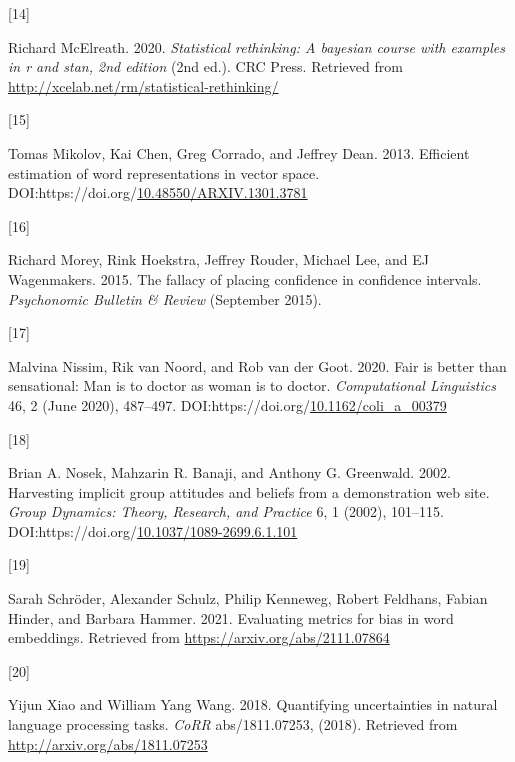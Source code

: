 \documentclass[
  12pt,
  dvipsnames,enabledeprecatedfontcommands]{scrartcl}
\newlength{\cslhangindent}
\newlength{\csllabelwidth}
\newlength{\cslentryspacingunit} %
\newenvironment{CSLReferences}[2] %
 {%
  \setlength{\parindent}{0pt}
  \ifodd #1
  \let\oldpar\par
  \def\par{\hangindent=\cslhangindent\oldpar}
  \fi
  \setlength{\parskip}{#2\cslentryspacingunit}
 }%
 {}
\newcommand{\CSLLeftMargin}[1]{\parbox[t]{\csllabelwidth}{#1}}
\newcommand{\CSLRightInline}[1]{\parbox[t]{\linewidth - \csllabelwidth}{#1}\break}
\begin{document}
\begin{CSLReferences}{0}{0}
\leavevmode{}%
\CSLLeftMargin{{[}14{]} }%
\CSLRightInline{Richard McElreath. 2020. \emph{Statistical rethinking: A
bayesian course with examples in r and stan, 2nd edition} (2nd ed.). CRC
Press. Retrieved from
\url{http://xcelab.net/rm/statistical-rethinking/}}

\leavevmode{}%
\CSLLeftMargin{{[}15{]} }%
\CSLRightInline{Tomas Mikolov, Kai Chen, Greg Corrado, and Jeffrey Dean.
2013. Efficient estimation of word representations in vector space.
DOI:https://doi.org/\href{https://doi.org/10.48550/ARXIV.1301.3781}{10.48550/ARXIV.1301.3781}}

\leavevmode{}%
\CSLLeftMargin{{[}16{]} }%
\CSLRightInline{Richard Morey, Rink Hoekstra, Jeffrey Rouder, Michael
Lee, and EJ Wagenmakers. 2015. The fallacy of placing confidence in
confidence intervals. \emph{Psychonomic Bulletin \& Review} (September
2015).}

\leavevmode{}%
\CSLLeftMargin{{[}17{]} }%
\CSLRightInline{Malvina Nissim, Rik van Noord, and Rob van der Goot.
2020. Fair is better than sensational: Man is to doctor as woman is to
doctor. \emph{Computational Linguistics} 46, 2 (June 2020), 487--497.
DOI:https://doi.org/\href{https://doi.org/10.1162/coli_a_00379}{10.1162/coli\_a\_00379}}

\leavevmode{}%
\CSLLeftMargin{{[}18{]} }%
\CSLRightInline{Brian A. Nosek, Mahzarin R. Banaji, and Anthony G.
Greenwald. 2002. Harvesting implicit group attitudes and beliefs from a
demonstration web site. \emph{Group Dynamics: Theory, Research, and
Practice} 6, 1 (2002), 101--115.
DOI:https://doi.org/\href{https://doi.org/10.1037/1089-2699.6.1.101}{10.1037/1089-2699.6.1.101}}

\leavevmode{}%
\CSLLeftMargin{{[}19{]} }%
\CSLRightInline{Sarah Schröder, Alexander Schulz, Philip Kenneweg,
Robert Feldhans, Fabian Hinder, and Barbara Hammer. 2021. Evaluating
metrics for bias in word embeddings. Retrieved from
\url{https://arxiv.org/abs/2111.07864}}

\leavevmode{}%
\CSLLeftMargin{{[}20{]} }%
\CSLRightInline{Yijun Xiao and William Yang Wang. 2018. Quantifying
uncertainties in natural language processing tasks. \emph{CoRR}
abs/1811.07253, (2018). Retrieved from
\url{http://arxiv.org/abs/1811.07253}}

\end{CSLReferences}
\end{document}
